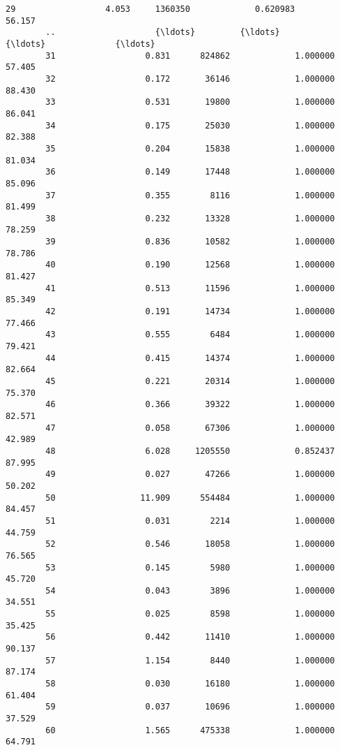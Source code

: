 \documentclass[11pt]{article}
\begin{document}
\begin{Verbatim}[commandchars=\\\{\}]
        29                  4.053     1360350             0.620983           56.157   
        ..                    {\ldots}         {\ldots}                  {\ldots}              {\ldots}   
        31                  0.831      824862             1.000000           57.405   
        32                  0.172       36146             1.000000           88.430   
        33                  0.531       19800             1.000000           86.041   
        34                  0.175       25030             1.000000           82.388   
        35                  0.204       15838             1.000000           81.034   
        36                  0.149       17448             1.000000           85.096   
        37                  0.355        8116             1.000000           81.499   
        38                  0.232       13328             1.000000           78.259   
        39                  0.836       10582             1.000000           78.786   
        40                  0.190       12568             1.000000           81.427   
        41                  0.513       11596             1.000000           85.349   
        42                  0.191       14734             1.000000           77.466   
        43                  0.555        6484             1.000000           79.421   
        44                  0.415       14374             1.000000           82.664   
        45                  0.221       20314             1.000000           75.370   
        46                  0.366       39322             1.000000           82.571   
        47                  0.058       67306             1.000000           42.989   
        48                  6.028     1205550             0.852437           87.995   
        49                  0.027       47266             1.000000           50.202   
        50                 11.909      554484             1.000000           84.457   
        51                  0.031        2214             1.000000           44.759   
        52                  0.546       18058             1.000000           76.565   
        53                  0.145        5980             1.000000           45.720   
        54                  0.043        3896             1.000000           34.551   
        55                  0.025        8598             1.000000           35.425   
        56                  0.442       11410             1.000000           90.137   
        57                  1.154        8440             1.000000           87.174   
        58                  0.030       16180             1.000000           61.404   
        59                  0.037       10696             1.000000           37.529   
        60                  1.565      475338             1.000000           64.791   
        

\end{Verbatim}
\end{document}
